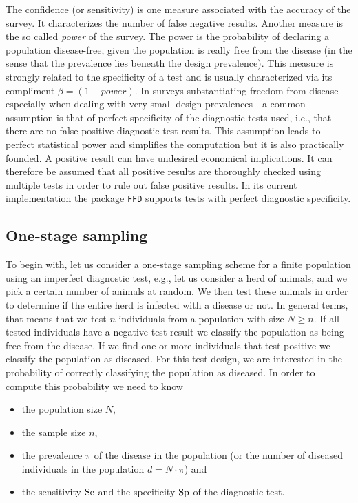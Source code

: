 \documentclass[nojss]{jss}
\begin{document}
The confidence (or sensitivity) is one measure associated with the accuracy of the survey. It characterizes the number of false negative results. Another measure is the so called \emph{power}  of the survey. The power is the probability of declaring a population disease-free, given the population is really free from the disease (in the sense that the prevalence lies beneath the design prevalence). This measure is strongly related to the specificity of a test and is usually characterized via its compliment  $\beta = (1-power)$. In surveys substantiating freedom from disease - especially when dealing with very small design prevalences - a common assumption is that of perfect specificity of the diagnostic tests used, i.e., that there are no false positive diagnostic test results. This assumption leads to perfect statistical power and simplifies the computation but it is also practically founded. A positive result can have undesired economical implications. It can therefore be assumed that all positive results are thoroughly checked using multiple tests in order to rule out false positive results. In its current implementation the package \texttt{FFD} supports tests with perfect diagnostic specificity.



\subsection{One-stage sampling} \label{subsec:1-stage-sampling}

To begin with, let us consider a one-stage sampling  scheme for a finite population using an imperfect diagnostic test, e.g., let us consider a herd of animals, and we pick a certain number of animals at random. We then test these animals in order to determine if the entire herd is infected with a disease or not. In general terms, that means that we test $n$ individuals from a population with size $N \geq n$. If all tested individuals have a negative test result we classify the population as being free from the disease. If we find one or more individuals that test positive we classify the population as diseased. For this test design, we are interested in the probability of correctly classifying the population as diseased. In order to compute this probability we need to know

\begin{itemize}
\item the population size $N$,
\item the sample size $n$,
\item the prevalence $\pi$ of the disease in the population (or the number of diseased individuals in the population $d = N\cdot\pi$) and
\item the sensitivity $\mbox{Se}$ and the specificity $\mbox{Sp}$ of the
      diagnostic test.
\end{itemize}
\end{document}
